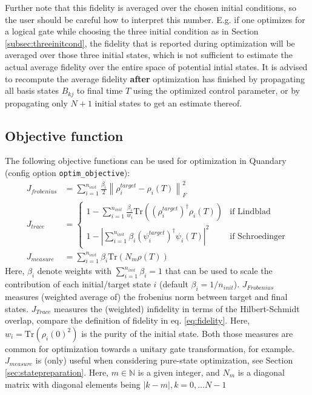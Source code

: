 \documentclass[11pt]{article}
\newcommand{\N}{\mathds{N}}
\begin{document}
Further note that this fidelity is averaged over the chosen initial conditions, so the user should be careful how to interpret this number. E.g. if one optimizes for a logical gate while choosing the three initial condition as in Section \ref{subsec:threeinitcond}, the fidelity that is reported during optimization will be averaged over those three initial states, which is not sufficient to estimate the actual average fidelity over the entire space of potential intial states. It is advised to recompute the average fidelity \textbf{after} optimization has finished by propagating all basis states $B_{kj}$ to final time $T$ using the optimized control parameter, or by propagating only $N+1$ initial states to get an estimate thereof.


\subsection{Objective function}\label{sec:objectivefunctionals}
The following objective functions can be used for optimization in Quandary (config option \texttt{optim\_objective}):
\begin{align}
 J_{frobenius} &= \sum_{i=1}^{n_{init}} \frac{\beta_i}{2} \left\| \rho^{target}_i - \rho_i(T)\right\|^2_F \\ 
 J_{trace} &= 
\begin{cases} 
 1 - \sum_{i=1}^{n_{init}} \frac{\beta_i}{w_i} \mbox{Tr}\left((\rho^{target}_i)^\dagger\rho_i(T)\right) & \text{if Lindblad}\\
 1 - \left|\sum_{i=1}^{n_{init}} \beta_i (\psi^{target}_i)^\dagger\psi_i(T)\right|^2 & \text{if Schroedinger}
\end{cases}\\
 J_{measure} &= \sum_{i=1}^{n_{init}} \beta_i \mbox{Tr} \left( N_m \rho(T) \right) \label{eq:Jmeasure} 
\end{align}
Here, $\beta_i$ denote weights with $\sum_{i=1}^{n_{init}} \beta _i = 1$ that can be used to scale the contribution of each initial/target state $i$ (default $\beta_i = 1/n_{init}$). 
$J_{Frobenius}$ measures (weighted average of) the frobenius norm between target and final states. $J_{Trace}$ measures the (weighted) infidelity in terms of the Hilbert-Schmidt overlap, compare the definition of fidelity in eq. \eqref{eq:fidelity}. Here, $w_i = \mbox{Tr}\left(\rho_i(0)^2\right)$ is the purity of the initial state. Both those measures are common for optimization towards a unitary gate transformation, for example. $J_{measure}$ is (only) useful when considering pure-state optimization, see Section \ref{sec:statepreparation}. Here, $m\in\N$ is a given integer, and $N_m$ is a diagonal matrix with diagonal elements being $|k-m|, k=0,\dots N-1$ 
\end{document}
